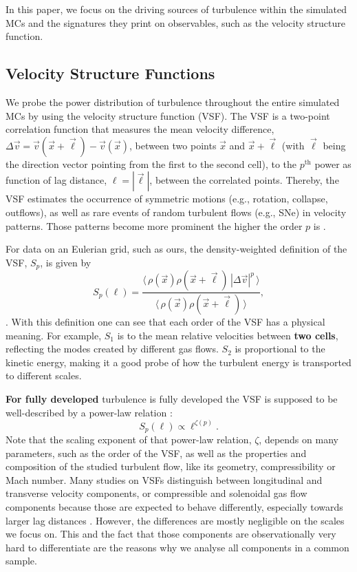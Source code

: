 In this paper, we focus on the driving sources of turbulence within the simulated MCs and the signatures they print on observables, such as the velocity structure function.


\subsection{Velocity Structure Functions}\label{methods:vsf}

We probe the power distribution of turbulence throughout the entire simulated MCs by using the velocity structure function (VSF).
The VSF is a two-point correlation function that measures the mean velocity difference, $\Delta \vec{v} = \vec{v}(\vec{x}+\vec{\ell}) - \vec{v}(\vec{x})$, between two points $\vec{x}$ and $\vec{x}+\vec{\ell}$ (with $\vec{\ell}$ being the direction vector pointing from the first to the second cell), to the $p^\mathrm{th}$ power as function of lag distance, $\ell = |\vec{\ell}|$, between the correlated points.
Thereby, the VSF estimates the occurrence of symmetric motions (e.g., rotation, collapse, outflows), as well as rare events of random turbulent flows (e.g., SNe) in velocity patterns.
Those patterns become more prominent the higher the order $p$ is \citep{Heyer2004}.

For data on an Eulerian grid, such as ours, the density-weighted definition of the VSF, $\mathit{S}_p$, is given by
\begin{equation}
	\mathit{S}_p (\ell) = \frac{\langle \, \rho(\vec{x}) \rho(\vec{x}+\vec{\ell}) \, |\Delta \vec{v}|^p  \, \rangle}{\langle  \, \rho(\vec{x}) \rho(\vec{x}+\vec{\ell}) \, \rangle} ,
    \label{equ:method:def_vsf}
\end{equation}
\citep[and references within]{Padoan2016a}.
With this definition one can see that each order of the VSF has a physical meaning. 
For example, $\mathit{S}_1$ is to the mean relative velocities between \textbf{two cells}, reflecting the modes created by different gas flows.
$\mathit{S}_2$ is proportional to the kinetic energy, making it a good probe of how the turbulent energy is transported to different scales.

\textbf{For fully developed} turbulence is fully developed the VSF is supposed to be well-described by a power-law relation \citep{Kolmogorov1941,She1994,Boldyrev2002}:
\begin{equation}
	\mathit{S}_p (\ell) \propto \ell^{\zeta(p)} .
    \label{equ:method:propto_zeta}
\end{equation}
Note that the scaling exponent of that power-law relation, $\zeta$, depends on many parameters, such as the order of the VSF, as well as the properties and composition of the studied turbulent flow, like its geometry, compressibility or Mach number.
Many studies on VSFs distinguish between longitudinal and transverse velocity components, or compressible and solenoidal gas flow components because those are expected to behave differently, especially towards larger lag distances \citep{Gotoh2002,Schmidt2008,Benzi2010}.
However, the differences are mostly negligible on the scales we focus on. 
This and the fact that those components are observationally very hard to differentiate are the reasons why we analyse all components in a common sample.

